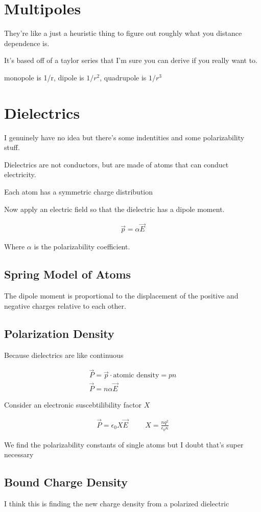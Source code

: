 \documentclass[fleqn]{report}
\newcommand{\hp}{\hspace{1cm}}
\newcommand{\equations} [1] {
\begin{gather*}
#1
\end{gather*}
}
\begin{document}
\section{Multipoles}
They're like a just a heuristic thing to figure out roughly what you 
distance dependence is.

It's based off of a taylor series that I'm sure you can derive if you really 
want to. 

monopole is 1/r, dipole is $1/r^2$, quadrupole is $1/r^3$

\section{Dielectrics}
I genuinely have no idea but there's some indentities and some polarizability 
stuff. 

Dielectrics are not conductors, but are made of atoms that can conduct 
electricity. 

Each atom has a symmetric charge distribution 

Now apply an electric field so that the dielectric has a dipole moment. 
\equations{
    \vec p = \alpha \vec E
}
Where $\alpha$ is the polarizability coefficient.

\subsection{Spring Model of Atoms}

The dipole moment is proportional to the displacement of the positive 
and negative charges relative to each other. 

\subsection{Polarization Density}
Because dielectrics are like continuous 

\equations{
    \vec P = \vec p \cdot \textrm{atomic density} = pn
    \\
    \vec P = n \alpha \vec E 
}

Consider an electronic suscebtilibility factor $X$ 

\equations{
    \vec P = \epsilon_0 X \vec E 
    \hp 
    X = \frac{n q^2}{\epsilon_0 \kappa}
}

We find the polarizability constants of single atoms but I doubt that's super 
necessary 

\subsection{Bound Charge Density}
I think this is finding the new charge density from a polarized dielectric 
\end{document}
